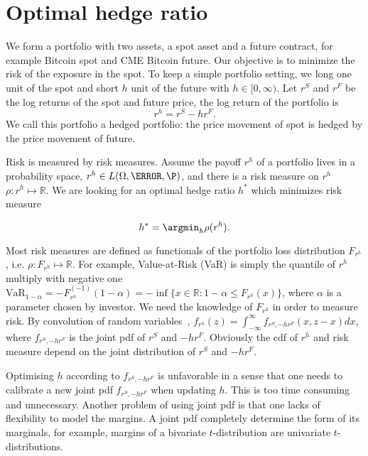 \section{Optimal hedge ratio}
\label{sec:optimal-hedge-ratio}
We form a portfolio with two assets, a spot asset and a future contract, for example Bitcoin spot and CME Bitcoin future.
Our objective is to minimize the risk of the exposure in the spot.
To keep a simple portfolio setting, we long one unit of the spot and short $h$ unit of the future with $h \in [0, \infty)$.
Let $r^S$ and $r^F$ be the log returns of the spot and future price, the log return of the portfolio is
\[r^h = r^S -h r^F.\]
We call this portfolio a hedged portfolio: the price movement of spot is hedged by the price movement of future.
\medskip



Risk is measured by risk measures.
Assume the payoff $r^h$ of a portfolio lives in a probability space, $r^h \in L(\Omega,\F, \P)$,
and there is a risk measure on $r^h$ $\rho: r^h \mapsto \mathbb{R}$.
We are looking for an optimal hedge ratio $h^*$ which minimizes risk measure

\[h^* = \argmin_h \rho(r^h).\]

Most risk measures are defined as functionals of the portfolio loss distribution $F_{r^h}$, i.e. $\rho: F_{r^h} \mapsto \mathbb{R}$.
For example, Value-at-Risk (VaR) is simply the quantile of $r^h$ multiply with negative one $\text{VaR}_{1-\alpha} = -F_{r^h}^{(-1)}(1-\alpha) = -\inf\{x \in \mathbb{R}: 1-\alpha \leq F_{r^h}(x) \}$, where $\alpha$ is a parameter chosen by investor.
We need the knowledge of $F_{r^h}$ in order to measure risk.
By convolution of random variables~\citep{WKHMVA}, $f_{r^h}(z) = \int_{-\infty}^{\infty}f_{r^S, -hr^F}(x, z-x)dx$, where
$f_{r^S, -hr^F}$ is the joint pdf of $r^S$ and $-hr^F$.
Obviously the cdf of $r^h$ and risk measure depend on the joint distribution of $r^S$ and $-hr^F$.\medskip

Optimising $h$ according to $f_{r^S,-hr^F}$ is unfavorable in a sense that one needs to calibrate a new joint pdf $f_{r^S, -hr^F}$ when updating $h$.
This is too time consuming and unnecessary.
Another problem of using joint pdf is that one lacks of flexibility to model the margins.
A joint pdf completely determine the form of its marginals, for example, margins of a bivariate $t$-distribution are
univariate $t$-distributions.\medskip

